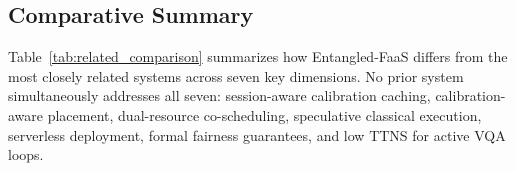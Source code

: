 \documentclass[conference]{IEEEtran}
\begin{document}
\subsection{Comparative Summary}
\label{subsec:related_comparison}

Table~\ref{tab:related_comparison} summarizes how Entangled-FaaS
differs from the most closely related systems across seven key
dimensions. No prior system simultaneously addresses all seven:
session-aware calibration caching, calibration-aware placement,
dual-resource co-scheduling, speculative classical execution,
serverless deployment, formal fairness guarantees, and low TTNS for
active VQA loops.


\begin{table}
\centering
\setlength{\extrarowheight}{0pt}
\setlength{\aboverulesep}{0pt}
\setlength{\belowrulesep}{0pt}
\caption{Comparison of hybrid quantum-classical execution approachesacross key scheduling dimensions.\textbf{Yes} = fully supported;\textit{Partial} = partially supported;No = not supported.}
\label{tab:related_comparison}
\end{table}
\end{document}
